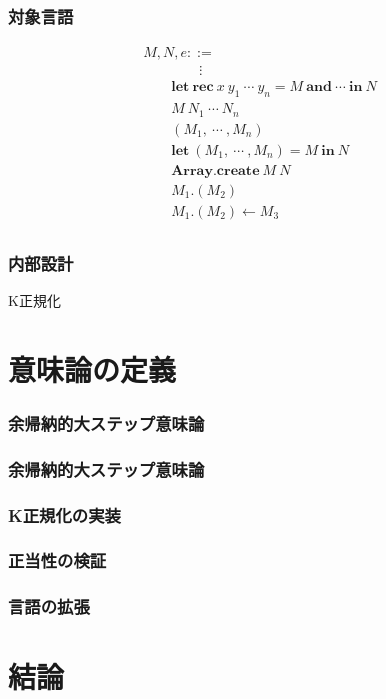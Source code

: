 \documentclass[dvipdfmx,cjk,xcolor=dvipsnames,envcountsect,notheorems,12pt]{beamer}
\theoremstyle{definition}
\newcommand{\keyword}[1]{\mathbf{#1}}
\newcommand{\LET}{\keyword{let}}
\newcommand{\REC}{\keyword{rec}}
\newcommand{\ARRAY}{\keyword{Array}}
\newcommand{\CREATE}{\keyword{create}}
\newcommand{\AND}{\keyword{and}}
\newcommand{\IN}{\keyword{in}}
\begin{document}
\begin{frame}
	\frametitle{対象言語}
	\Large
\[
\begin{array}{l}
  M, N, e ::= \\
	\qquad \qquad \vdots\\
  \qquad \LET~\REC~x~y_1~\cdots~y_n=M~\AND~\cdots~\IN~N\\
  \qquad M~N_1~\cdots~N_n\\
  \qquad (M_1,~\cdots~,M_n)\\
  \qquad \LET~(M_1,~\cdots~,M_n)=M~\IN~N\\
  \qquad \ARRAY.\CREATE~M~N\\
  \qquad M_1.(M_2)\\
  \qquad M_1.(M_2)\leftarrow M_3\\
\end{array}
\]
\end{frame}

\begin{frame}
	\frametitle{内部設計}
\end{frame}

\begin{frame}
	\Huge K正規化
\end{frame}

\section{意味論の定義}

\begin{frame}
	\frametitle{余帰納的大ステップ意味論}
\end{frame}

\begin{frame}
	\frametitle{余帰納的大ステップ意味論}
\end{frame}

\begin{frame}
	\frametitle{K正規化の実装}
\end{frame}

\begin{frame}
	\frametitle{正当性の検証}
\end{frame}

\begin{frame}
	\frametitle{言語の拡張}
\end{frame}

\section{結論}
\end{document}
